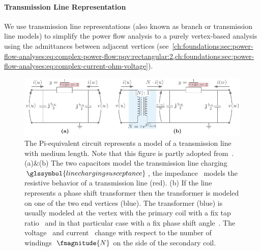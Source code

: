 \paragraph{Transmission Line Representation}
\label{ch:foundations:sec:power-flow-analyses:transmission-line-representation}
% 
We use transmission line representations (also known as branch or transmission
line models) to simplify the power flow analysis to a purely vertex-based
analysis using the admittances between adjacent vertices
(see~\cref{ch:foundations:sec:power-flow-analyses:eq:complex-power-flow:pqv:rectangular:2,ch:foundations:sec:power-flow-analyses:eq:complex-current-ohm-voltage}).%
\begin{figure}
    \includegraphics{foundations/figures/pi-equivalent-circuit.pdf}
    \caption[The Pi-equivalent circuit model for a transmission line]{The
    Pi-equivalent circuit represents a model of a transmission line with medium
    length. Note that this figure is partly adopted from~\textcite[p.17; Figure
    3-1]{Zimmerman2011}. (a)\&(b) The two capacitors model the transmission
    line charging~$\glssymbol{linechargingsusceptance}$, the
    impedance~ models the resistive behavior of a
    transmission line (red). (b) If the line represents a phase shift
    transformer then the transformer is modeled on one of the two end vertices
    (blue). The transformer (blue) is usually modeled at the vertex with the
    primary coil with a fix tap ratio~ and in that
    particular case with a fix phase shift angle~.
    The voltage~ and current~ change with
    respect to the number of windings~$\fmagnitude{N}$ on the side of the
    secondary coil. }
    \label{ch:foundations:sec:power-flow-analyses:fig:pi-equivalent-circuit}
\end{figure}
% 


